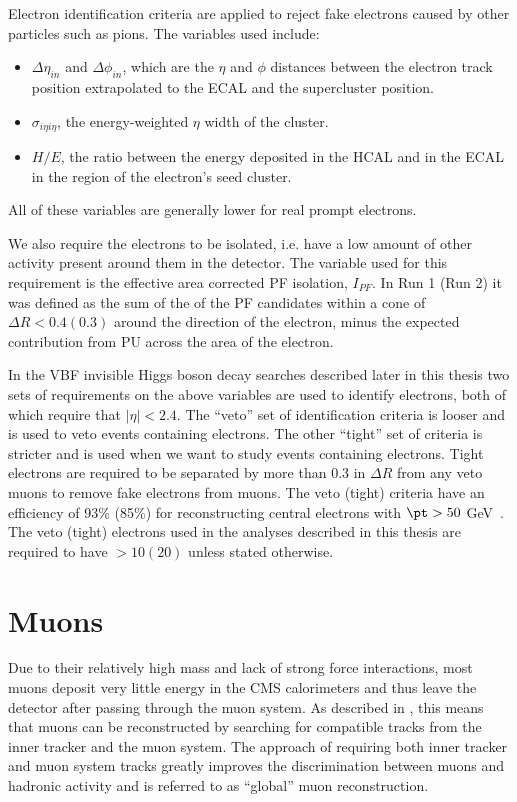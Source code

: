 Electron identification criteria are applied to reject fake electrons caused by other particles such as pions. The variables used include:
\begin{itemize}
\item $\Delta\eta_{in}$ and $\Delta\phi_{in}$, which are the $\eta$ and $\phi$ distances between the electron track position extrapolated to the \ac{ECAL} and the supercluster position.
\item $\sigma_{i\eta i\eta}$, the energy-weighted $\eta$ width of the cluster.
\item $H/E$, the ratio between the energy deposited in the \ac{HCAL} and in the \ac{ECAL} in the region of the electron's seed cluster.
\end{itemize}
All of these variables are generally lower for real prompt electrons.

We also require the electrons to be isolated, i.e. have a low amount of other activity present around them in the detector. The variable used for this requirement is the effective area corrected \ac{PF} isolation, $I_{PF}$. In Run 1 (Run 2) it was defined as the sum of the \pt of the \ac{PF} candidates within a cone of $\Delta R<0.4(0.3)$ around the direction of the electron, minus the expected contribution from \ac{PU} across the area of the electron.

In the \ac{VBF} invisible Higgs boson decay searches described later in this thesis two sets of requirements on the above variables are used to identify electrons, both of which require that $|\eta|<2.4$. The ``veto'' set of identification criteria is looser and is used to veto events containing electrons. The other ``tight'' set of criteria is stricter and is used when we want to study events containing electrons. Tight electrons are required to be separated by more than 0.3 in $\Delta R$ from any veto muons to remove fake electrons from muons. The veto (tight) criteria have an efficiency of 93\% (85\%) for reconstructing central electrons with $\pt>50$ GeV~\cite{eleeff}. The veto (tight) electrons used in the analyses described in this thesis are required to have \pt$>10 (20)$ \GeV unless stated otherwise.

\section{Muons}
\label{sec:muons}
Due to their relatively high mass and lack of strong force interactions, most muons deposit very little energy in the CMS calorimeters and thus leave the detector after passing through the muon system. As described in , this means that muons can be reconstructed by searching for compatible tracks from the inner tracker and the muon system. The approach of requiring both inner tracker and muon system tracks greatly improves the discrimination between muons and hadronic activity and is referred to as ``global'' muon reconstruction.

